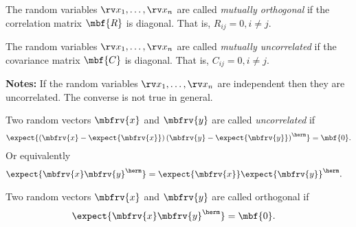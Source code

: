 \begin{mydefinition}
    The random variables $\stringRVs{x}{n}$ are called \emph{mutually orthogonal} if the correlation matrix $\mbf{R}$ is diagonal. That is, $R_{ij}=0, i\neq j$.
\end{mydefinition}
\begin{mydefinition}
    The random variables $\stringRVs{x}{n}$ are called \emph{mutually uncorrelated} if the covariance matrix $\mbf{C}$ is diagonal. That is, $C_{ij}=0, i\neq j$.
\end{mydefinition}

\begin{myBlueBox}
    \textbf{Notes:} If the random variables $\stringRVs{x}{n}$ are independent then they are uncorrelated. The converse is not true in general.
\end{myBlueBox}

\begin{mydefinition}
    Two random vectors $\mbfrv{x}$ and $\mbfrv{y}$  are called \emph{uncorrelated} if 
    \begin{align}
        \expect{\left(\mbfrv{x}-\expect{\mbfrv{x}}\right)\left(\mbfrv{y}-\expect{\mbfrv{y}}\right)^{\herm}}=\mbf{0}.
    \end{align}
    Or equivalently
    \begin{align}
        \expect{\mbfrv{x}\mbfrv{y}^{\herm}} &= \expect{\mbfrv{x}}\expect{\mbfrv{y}}^{\herm}.
    \end{align}
\end{mydefinition}
\begin{mydefinition}
    Two random vectors $\mbfrv{x}$ and $\mbfrv{y}$ are called orthogonal if 
    \begin{align}
        \expect{\mbfrv{x}\mbfrv{y}^{\herm}} &= \mbf{0}.
    \end{align}
\end{mydefinition}

